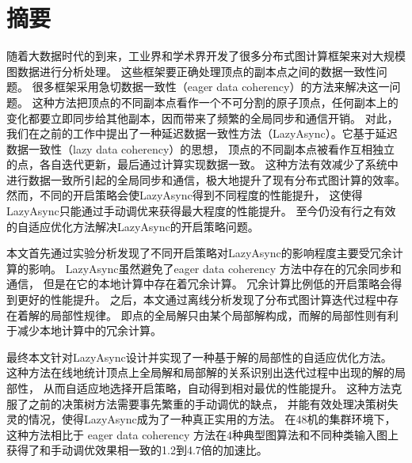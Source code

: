 \maketitle%
\MAKETITLE%
\makedeclaration%
\intobmk\chapter*{摘\quad 要}%
\setcounter{page}{1}%

随着大数据时代的到来，工业界和学术界开发了很多分布式图计算框架来对大规模图数据进行分析处理。
这些框架要正确处理顶点的副本点之间的数据一致性问题。
很多框架采用急切数据一致性（eager data coherency）的方法来解决这一问题。
这种方法把顶点的不同副本点看作一个不可分割的原子顶点，任何副本上的变化都要立即同步给其他副本，因而带来了频繁的全局同步和通信开销。
对此，我们在之前的工作中提出了一种延迟数据一致性方法（LazyAsync）。它基于延迟数据一致性（lazy data coherency）的思想，
顶点的不同副本点被看作互相独立的点，各自迭代更新，最后通过计算实现数据一致。
这种方法有效减少了系统中进行数据一致所引起的全局同步和通信，极大地提升了现有分布式图计算的效率。
然而，不同的开启策略会使LazyAsync得到不同程度的性能提升，
这使得LazyAsync只能通过手动调优来获得最大程度的性能提升。
至今仍没有行之有效的自适应优化方法解决LazyAsync的开启策略问题。

本文首先通过实验分析发现了不同开启策略对LazyAsync的影响程度主要受冗余计算的影响。
LazyAsync虽然避免了eager data coherency 方法中存在的冗余同步和通信，
但是在它的本地计算中存在着冗余计算。
冗余计算比例低的开启策略会得到更好的性能提升。
之后，本文通过离线分析发现了分布式图计算迭代过程中存在着解的局部性规律。
即点的全局解只由某个局部解构成，而解的局部性则有利于减少本地计算中的冗余计算。

最终本文针对LazyAsync设计并实现了一种基于解的局部性的自适应优化方法。
这种方法在线地统计顶点上全局解和局部解的关系识别出迭代过程中出现的解的局部性，
从而自适应地选择开启策略，自动得到相对最优的性能提升。
这种方法克服了之前的决策树方法需要事先繁重的手动调优的缺点，
并能有效处理决策树失灵的情况，使得LazyAsync成为了一种真正实用的方法。
在48机的集群环境下，这种方法相比于 eager data coherency 方法在4种典型图算法和不同种类输入图上
获得了和手动调优效果相一致的1.2到4.7倍的加速比。




